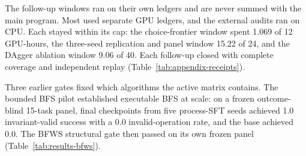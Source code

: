The follow-up windows ran on their own ledgers and are never summed with the main program. Most used separate GPU ledgers, and the external audits ran on CPU. Each stayed within its cap: the choice-frontier window spent 1.069 of 12 GPU-hours, the three-seed replication and panel window 15.22 of 24, and the DAgger ablation window 9.06 of 40.
Each follow-up closed with complete coverage and independent replay (Table~\ref{tab:appendix-receipts}).


Three earlier gates fixed which algorithms the active matrix contains. The bounded BFS pilot established executable BFS at scale: on a frozen outcome-blind 15-task panel, final checkpoints from five process-SFT seeds achieved 1.0 invariant-valid success with a 0.0 invalid-operation rate, and the base achieved 0.0. The BFWS structural gate then passed on its own frozen panel (Table~\ref{tab:results-bfws}).

